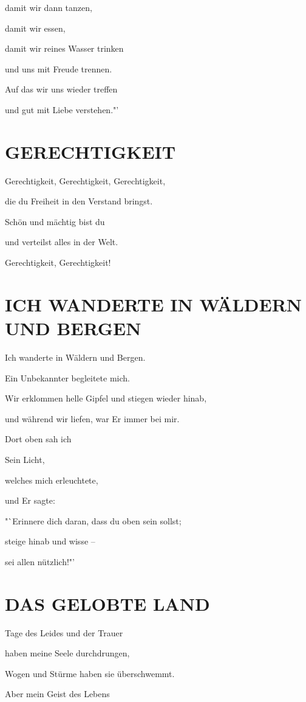 \documentclass[11pt,a5paper,twoside]{article}
\begin{document}
damit wir dann tanzen, 

damit wir essen, 

damit wir reines Wasser trinken

und uns mit Freude trennen.

Auf das wir uns wieder treffen

und gut mit Liebe verstehen."'


\section[Gerechtigkeit]{GERECHTIGKEIT}

Gerechtigkeit, Gerechtigkeit, Gerechtigkeit,

die du Freiheit in den Verstand bringst.

Schön und mächtig bist du 

und verteilst alles in der Welt. 

Gerechtigkeit, Gerechtigkeit!

\section[Ich wanderte in Wäldern und Bergen]{ICH WANDERTE IN WÄLDERN UND BERGEN}

Ich wanderte in Wäldern und Bergen.

Ein Unbekannter begleitete mich.

Wir erklommen helle Gipfel und stiegen wieder hinab, 

und während wir liefen, war Er immer bei mir. 

Dort oben sah ich

Sein Licht, 

welches mich erleuchtete, 

und Er sagte: 

"`Erinnere dich daran, dass du oben sein sollst;

steige hinab und wisse --

sei allen nützlich!"'


\section[Das gelobte Land]{DAS GELOBTE LAND}

Tage des Leides und der Trauer 

haben meine Seele durchdrungen,

Wogen und Stürme haben sie überschwemmt.

Aber mein Geist des Lebens
\end{document}
